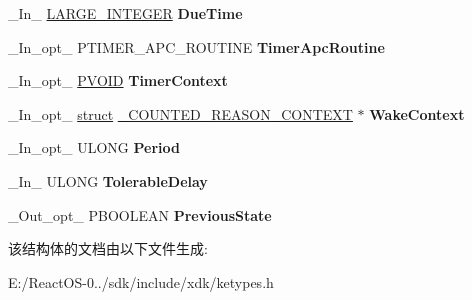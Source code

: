 \begin{DoxyCompactItemize}
\item 
\mbox{\label{struct___t_i_m_e_r___s_e_t___c_o_a_l_e_s_c_a_b_l_e___t_i_m_e_r___i_n_f_o_a5cc0da2c3e1a05e0975c039b0ca08cd0}} 
\+\_\+\+In\+\_\+ \hyperlink{union___l_a_r_g_e___i_n_t_e_g_e_r}{L\+A\+R\+G\+E\+\_\+\+I\+N\+T\+E\+G\+ER} {\bfseries Due\+Time}
\item 
\mbox{\label{struct___t_i_m_e_r___s_e_t___c_o_a_l_e_s_c_a_b_l_e___t_i_m_e_r___i_n_f_o_a16b5f1d03663c8b902e25e95f1c25e88}} 
\+\_\+\+In\+\_\+opt\+\_\+ P\+T\+I\+M\+E\+R\+\_\+\+A\+P\+C\+\_\+\+R\+O\+U\+T\+I\+NE {\bfseries Timer\+Apc\+Routine}
\item 
\mbox{\label{struct___t_i_m_e_r___s_e_t___c_o_a_l_e_s_c_a_b_l_e___t_i_m_e_r___i_n_f_o_a1409365308ace117faacb341717ee3f2}} 
\+\_\+\+In\+\_\+opt\+\_\+ \hyperlink{interfacevoid}{P\+V\+O\+ID} {\bfseries Timer\+Context}
\item 
\mbox{\label{struct___t_i_m_e_r___s_e_t___c_o_a_l_e_s_c_a_b_l_e___t_i_m_e_r___i_n_f_o_a22e5bb296d1d7ee4c66938daad7faf6e}} 
\+\_\+\+In\+\_\+opt\+\_\+ \hyperlink{interfacestruct}{struct} \hyperlink{struct___c_o_u_n_t_e_d___r_e_a_s_o_n___c_o_n_t_e_x_t}{\+\_\+\+C\+O\+U\+N\+T\+E\+D\+\_\+\+R\+E\+A\+S\+O\+N\+\_\+\+C\+O\+N\+T\+E\+XT} $\ast$ {\bfseries Wake\+Context}
\item 
\mbox{\label{struct___t_i_m_e_r___s_e_t___c_o_a_l_e_s_c_a_b_l_e___t_i_m_e_r___i_n_f_o_a1b712301f72242f9a6fc659af2c8f4b5}} 
\+\_\+\+In\+\_\+opt\+\_\+ U\+L\+O\+NG {\bfseries Period}
\item 
\mbox{\label{struct___t_i_m_e_r___s_e_t___c_o_a_l_e_s_c_a_b_l_e___t_i_m_e_r___i_n_f_o_ab53a0bf84035dcbcb930917cc389a6c7}} 
\+\_\+\+In\+\_\+ U\+L\+O\+NG {\bfseries Tolerable\+Delay}
\item 
\mbox{\label{struct___t_i_m_e_r___s_e_t___c_o_a_l_e_s_c_a_b_l_e___t_i_m_e_r___i_n_f_o_a49a04e979f4b7f4c9b5a58f9fcf03496}} 
\+\_\+\+Out\+\_\+opt\+\_\+ P\+B\+O\+O\+L\+E\+AN {\bfseries Previous\+State}
\end{DoxyCompactItemize}


该结构体的文档由以下文件生成\+:\begin{DoxyCompactItemize}
\item 
E\+:/\+React\+O\+S-\/0../sdk/include/xdk/ketypes.\+h\end{DoxyCompactItemize}
